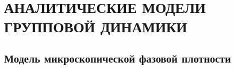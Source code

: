 \chapter{АНАЛИТИЧЕСКИЕ МОДЕЛИ ГРУППОВОЙ ДИНАМИКИ}
\label{ch:TheoreticalModels}




\section{Модель микроскопической фазовой плотности} %
\label{sec:KulinskyModel}

